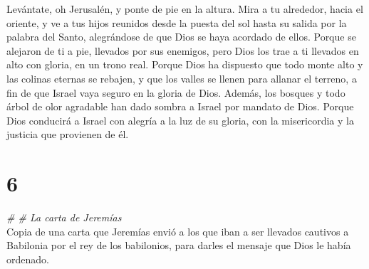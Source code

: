  Levántate, oh Jerusalén, y ponte de pie en la altura.
Mira a tu alrededor, hacia el oriente, y ve a tus hijos reunidos desde
la puesta del sol hasta su salida por la palabra del Santo, alegrándose
de que Dios se haya acordado de ellos.  Porque se alejaron
de ti a pie, llevados por sus enemigos, pero Dios los trae a ti llevados
en alto con gloria, en un trono real.  Porque Dios ha
dispuesto que todo monte alto y las colinas eternas se rebajen, y que
los valles se llenen para allanar el terreno, a fin de que Israel vaya
seguro en la gloria de Dios.  Además, los bosques y todo
árbol de olor agradable han dado sombra a Israel por mandato de Dios.
 Porque Dios conducirá a Israel con alegría a la luz de su
gloria, con la misericordia y la justicia que provienen de él.

\hypertarget{section-5}{%
\section{6}\label{section-5}}

\emph{\# \# La carta de Jeremías}\\

 Copia de una carta que Jeremías envió a los que iban a
ser llevados cautivos a Babilonia por el rey de los babilonios, para
darles el mensaje que Dios le había ordenado.

